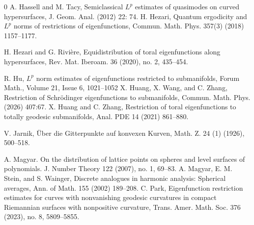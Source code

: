 \documentclass[11pt,reqno]{amsart}
\numberwithin{equation}{section}
\newcommand{\1}{\textbf{1}}
\begin{document}
\begin{thebibliography}{0}
		 A. Hassell and M. Tacy, Semiclassical $L^p$ estimates of quasimodes on curved hypersurfaces, J. Geom. Anal. (2012) 22: 74.
		H. Hezari, Quantum ergodicity and $L^p$ norms of restrictions of eigenfunctions, Commun. Math. Phys. 357(3) (2018) 1157--1177.
		
		 H. Hezari and G. Rivi\`ere, Equidistribution of toral eigenfunctions along hypersurfaces, Rev. Mat. Iberoam. 36 (2020), no. 2, 435--454.
		
		
		 R. Hu, $L^p$ norm estimates of eigenfunctions restricted to submanifolds, Forum Math., Volume 21, Issue 6, 1021--1052
		X. Huang, X. Wang, and C. Zhang, Restriction of Schr\"odinger eigenfunctions to submanifolds, Commun. Math. Phys. (2026) 407:67.
		X. Huang and C. Zhang, Restriction of toral eigenfunctions to totally geodesic submanifolds, Anal. PDE 14 (2021) 861--880.
		
		 V. Jarnik, \"Uber die Gitterpunkte auf konvexen Kurven, Math. Z. 24 (1) (1926), 500--518.
		
		A. Magyar. On the distribution of lattice points on spheres and level surfaces
		of polynomials. J. Number Theory 122 (2007), no. 1, 69--83.
		A. Magyar, E. M. Stein, and S. Wainger, Discrete analogues in harmonic analysis: Spherical averages, Ann. of Math. 155 (2002) 189--208.
		C. Park, Eigenfunction restriction estimates for curves with nonvanishing geodesic curvatures
		in compact Riemannian surfaces with nonpositive curvature, Trans. Amer. Math. Soc. 376
		(2023), no. 8, 5809--5855.
		

\end{thebibliography}
\end{document}
